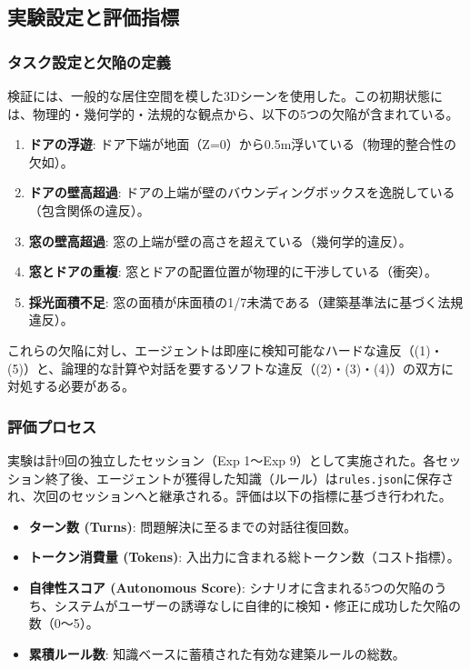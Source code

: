 \documentclass[dvipdfmx, a4paper, 9pt]{deimj}
\begin{document}
\subsection{実験設定と評価指標}

\subsubsection{タスク設定と欠陥の定義}

検証には、一般的な居住空間を模した3Dシーンを使用した。この初期状態には、物理的・幾何学的・法規的な観点から、以下の5つの欠陥が含まれている。

\begin{enumerate}
  \item \textbf{ドアの浮遊}: ドア下端が地面（Z=0）から0.5m浮いている（物理的整合性の欠如）。
  \item \textbf{ドアの壁高超過}: ドアの上端が壁のバウンディングボックスを逸脱している（包含関係の違反）。
  \item \textbf{窓の壁高超過}: 窓の上端が壁の高さを超えている（幾何学的違反）。
  \item \textbf{窓とドアの重複}: 窓とドアの配置位置が物理的に干渉している（衝突）。
  \item \textbf{採光面積不足}: 窓の面積が床面積の1/7未満である（建築基準法に基づく法規違反）。
\end{enumerate}

これらの欠陥に対し、エージェントは即座に検知可能なハードな違反（(1)・(5)）と、論理的な計算や対話を要するソフトな違反（(2)・(3)・(4)）の双方に対処する必要がある。

\subsubsection{評価プロセス}

実験は計9回の独立したセッション（Exp 1〜Exp 9）として実施された。各セッション終了後、エージェントが獲得した知識（ルール）は\texttt{rules.json}に保存され、次回のセッションへと継承される。評価は以下の指標に基づき行われた。

\begin{itemize}
  \item \textbf{ターン数 (Turns)}: 問題解決に至るまでの対話往復回数。
  \item \textbf{トークン消費量 (Tokens)}: 入出力に含まれる総トークン数（コスト指標）。
  \item \textbf{自律性スコア (Autonomous Score)}: シナリオに含まれる5つの欠陥のうち、システムがユーザーの誘導なしに自律的に検知・修正に成功した欠陥の数（0〜5）。
  \item \textbf{累積ルール数}: 知識ベースに蓄積された有効な建築ルールの総数。
\end{itemize}
\end{document}
